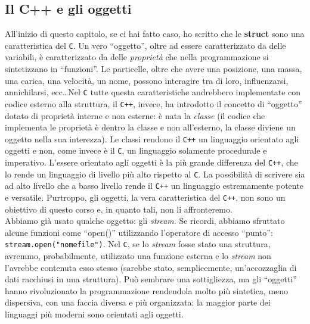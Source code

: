 \begin{small}
\section{Il C++ e gli oggetti}
All'inizio di questo capitolo, se ci hai fatto caso, ho scritto che le \textbf{struct} sono una caratteristica del \verb|C|. Un vero ``oggetto'', oltre ad essere caratterizzato da delle variabili, è caratterizzato da delle \emph{proprietà} che nella programmazione si sintetizzano in ``funzioni''. Le particelle, oltre che avere una posizione, una massa, una carica, una velocità, un nome, possono interagire tra di loro, influenzarsi, annichilarsi, ecc\ldots Nel \verb|C| tutte questa caratteristiche andrebbero implementate con codice esterno alla struttura, il \verb|C++|, invece, ha introdotto il concetto di ``oggetto'' dotato di proprietà interne e non esterne: è nata la \emph{classe} (il codice che implementa le proprietà è dentro la classe e non all'esterno, la classe diviene un oggetto nella sua interezza). Le classi rendono il \verb|C++| un linguaggio orientato agli oggetti e non, come invece è il \verb|C|, un linguaggio solamente procedurale e imperativo. L'essere orientato agli oggetti è la più grande differenza del \verb|C++|, che lo rende un linguaggio di livello più alto rispetto al \verb|C|. La possibilità di scrivere sia ad alto livello che a basso livello rende il \verb|C++| un linguaggio estremamente potente e versatile. Purtroppo, gli oggetti, la vera caratteristica del \verb|C++|, non sono un obiettivo di questo corso e, in quanto tali, non li affronteremo.\\

Abbiamo già usato qualche oggetto: gli \emph{stream}. Se ricordi, abbiamo sfruttato alcune funzioni come ``open()'' utilizzando l'operatore di accesso ``punto'': \verb|stream.open("nomefile")|. Nel \verb|C|, se lo \emph{stream} fosse stato una struttura, avremmo, probabilmente, utilizzato una funzione esterna e lo \emph{stream} non l'avrebbe contenuta esso stesso (sarebbe stato, semplicemente, un'accozzaglia di dati racchiusi in una struttura). Può sembrare una sottigliezza, ma gli ``oggetti'' hanno rivoluzionato la programmazione rendendola molto più sintetica, meno dispersiva, con una faccia diversa e più organizzata: la maggior parte dei linguaggi più moderni sono orientati agli oggetti.
\end{small}

